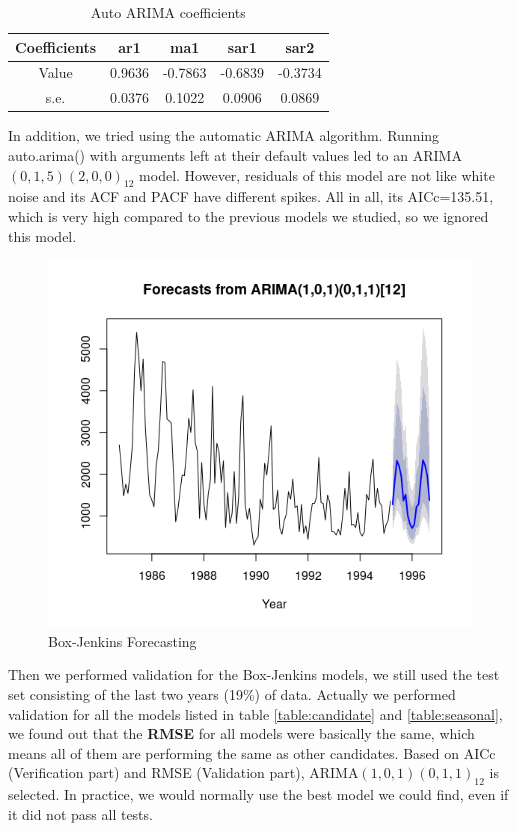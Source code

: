 \documentclass[journal, a4paper]{IEEEtran}
\begin{document}
\begin{table}[H]
\caption{Auto ARIMA coefficients}
\label{table:autoArima}
\centering
\begin{tabular}{|c|c|c|c|c|}
\hline
Coefficients & ar1 & ma1 & sar1 & sar2 \\ \hline
Value & 0.9636 & -0.7863 & -0.6839 & -0.3734 \\  \hline
s.e. & 0.0376 & 0.1022 & 0.0906 & 0.0869 \\
\hline
\end{tabular}
\end{table}

In addition, we tried using the automatic ARIMA algorithm. Running auto.arima() with arguments left at their default values led to an ARIMA$(0,1,5)(2,0,0)_{12}$ model. However, residuals of this model are not like white noise and its ACF and PACF have different spikes.  All in all, its AICc=135.51, which is very high compared to the previous models we studied, so we ignored this model.
\begin{figure}[H]
\begin{center}
\includegraphics[scale=0.4]{fig1/forecast_BJ.png}
\caption{Box-Jenkins Forecasting}
\label{fig1:bj_forecast}
\end{center}
\end{figure}

Then we performed validation for the Box-Jenkins models, we still used the test set consisting of the last two years (19\%) of data.
Actually we performed validation for all the models listed in table \ref{table:candidate} and \ref{table:seasonal}, we found out that the \textbf{RMSE} for all models were basically the same, which means all of them are performing  the same as other candidates. Based on AICc (Verification part) and RMSE (Validation part),  ARIMA$(1,0,1)(0,1,1)_{12}$ is selected. In practice, we would normally use the best model we could find, even if it did not pass all tests.
\end{document}
